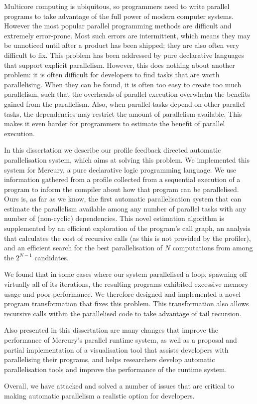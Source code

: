 
Multicore computing is ubiquitous,
so programmers need to write
parallel programs to take advantage of the full power of modern computer
systems.
However the most popular parallel programming methods are difficult and
extremely error-prone.
Most such errors are intermittent,
which means they may be unnoticed until after a product has been shipped;
they are also often very difficult to fix.
This problem has been addressed by pure declarative languages that support
explicit parallelism.
However, this does nothing about another problem:
it is often difficult for developers to find tasks that are worth
parallelising.
When they can be found,
it is often too easy to create too much parallelism,
such that the overheads of parallel execution overwhelm the benefits gained
from the parallelism.
Also, when parallel tasks depend on other parallel tasks,
the dependencies may restrict the amount of parallelism available.
This makes it even harder for programmers to estimate the benefit of
parallel execution.

In this dissertation we describe our 
profile feedback directed automatic parallelisation system,
which aims at solving this problem.
We implemented this system for Mercury, a pure declarative logic programming
language.
We use information gathered from a profile collected from a sequential
execution of a program to inform the compiler about how that program can be
parallelised.
Ours is, as far as we know, the first automatic parallelisation system that
can estimate the parallelism available among any number of parallel tasks
with any number of (non-cyclic) dependencies.
This novel estimation algorithm is supplemented by
an efficient exploration of the program's call graph,
an analysis that calculates the cost of recursive calls (as this is not provided
by the profiler),
and an efficient search for the best parallelisation of $N$ computations 
from among the $2^{N-1}$ candidates.

We found that in some cases where our system parallelised a loop,
spawning off virtually all of its iterations,
the resulting programs exhibited excessive memory usage and poor
performance.
We therefore designed and implemented
a novel program transformation that fixes this problem.
This transformation also allows recursive calls within the parallelised code
to take advantage of tail recursion.

Also presented in this dissertation are many changes that improve the
performance of Mercury's parallel runtime system,
as well as a proposal and partial implementation of a visualisation tool
that assists developers with parallelising their programs,
and helps researchers develop automatic parallelisation tools and
improve the performance of the runtime system.

Overall,
we have attacked and solved a number of issues that are critical to
making automatic parallelism a realistic option for developers.


